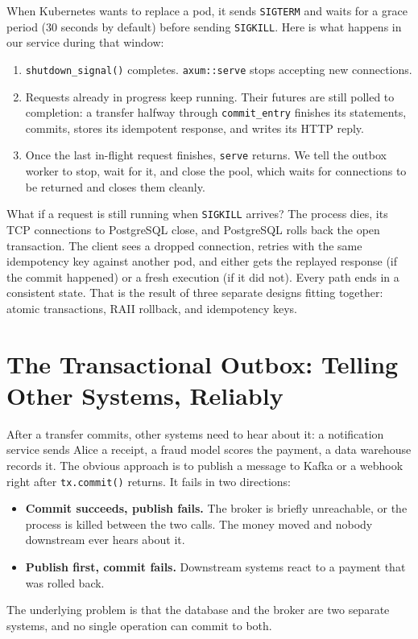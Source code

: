 When Kubernetes wants to replace a pod, it sends \texttt{SIGTERM} and waits for a grace period (30 seconds by default) before sending \texttt{SIGKILL}. Here is what happens in our service during that window:
\begin{enumerate}
  \item \texttt{shutdown\_signal()} completes. \texttt{axum::serve} stops accepting new connections.
  \item Requests already in progress keep running. Their futures are still polled to completion: a transfer halfway through \texttt{commit\_entry} finishes its statements, commits, stores its idempotent response, and writes its HTTP reply.
  \item Once the last in-flight request finishes, \texttt{serve} returns. We tell the outbox worker to stop, wait for it, and close the pool, which waits for connections to be returned and closes them cleanly.
\end{enumerate}
What if a request is still running when \texttt{SIGKILL} arrives? The process dies, its TCP connections to PostgreSQL close, and PostgreSQL rolls back the open transaction. The client sees a dropped connection, retries with the same idempotency key against another pod, and either gets the replayed response (if the commit happened) or a fresh execution (if it did not). Every path ends in a consistent state. That is the result of three separate designs fitting together: atomic transactions, RAII rollback, and idempotency keys.

\section{The Transactional Outbox: Telling Other Systems, Reliably}
\label{ch14:outbox}

After a transfer commits, other systems need to hear about it: a notification service sends Alice a receipt, a fraud model scores the payment, a data warehouse records it. The obvious approach is to publish a message to Kafka or a webhook right after \texttt{tx.commit()} returns. It fails in two directions:
\begin{itemize}
  \item \textbf{Commit succeeds, publish fails.} The broker is briefly unreachable, or the process is killed between the two calls. The money moved and nobody downstream ever hears about it.
  \item \textbf{Publish first, commit fails.} Downstream systems react to a payment that was rolled back.
\end{itemize}
The underlying problem is that the database and the broker are two separate systems, and no single operation can commit to both.

